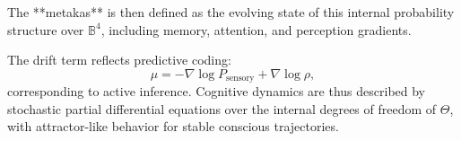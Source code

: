 \documentclass[12pt]{article}
\begin{document}
The **metakas** is then defined as the evolving state of this internal probability structure over \( \mathbb{B}^4 \), including memory, attention, and perception gradients.

The drift term reflects predictive coding:
\[
\mu = -\nabla \log P_\text{sensory} + \nabla \log \rho,
\]
corresponding to active inference. Cognitive dynamics are thus described by stochastic partial differential equations over the internal degrees of freedom of \( \Theta \), with attractor-like behavior for stable conscious trajectories.
\end{document}
